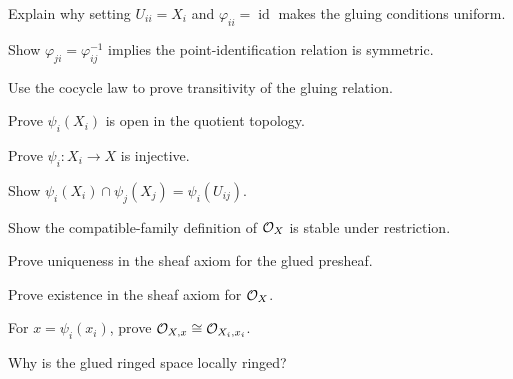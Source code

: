 \begin{exercise}\label{ex:vi20-01}
Explain why setting $U_{ii}=X_i$ and $\varphi_{ii}=\operatorname{id}$ makes the gluing conditions uniform.
\end{exercise}

\begin{exercise}\label{ex:vi20-02}
Show $\varphi_{ji}=\varphi_{ij}^{-1}$ implies the point-identification relation is symmetric.
\end{exercise}

\begin{exercise}[Transitivity]\label{ex:vi20-03}
Use the cocycle law to prove transitivity of the gluing relation.
\end{exercise}

\begin{exercise}\label{ex:vi20-04}
Prove $\psi_i(X_i)$ is open in the quotient topology.
\end{exercise}

\begin{exercise}\label{ex:vi20-05}
Prove $\psi_i:X_i\to X$ is injective.
\end{exercise}

\begin{exercise}\label{ex:vi20-06}
Show $\psi_i(X_i)\cap\psi_j(X_j)=\psi_i(U_{ij})$.
\end{exercise}

\begin{exercise}\label{ex:vi20-07}
Show the compatible-family definition of $\mathcal O_X$ is stable under restriction.
\end{exercise}

\begin{exercise}\label{ex:vi20-08}
Prove uniqueness in the sheaf axiom for the glued presheaf.
\end{exercise}

\begin{exercise}\label{ex:vi20-09}
Prove existence in the sheaf axiom for $\mathcal O_X$.
\end{exercise}

\begin{exercise}\label{ex:vi20-10}
For $x=\psi_i(x_i)$, prove $\mathcal O_{X,x}\cong\mathcal O_{X_i,x_i}$.
\end{exercise}

\begin{exercise}[Locality]\label{ex:vi20-11}
Why is the glued ringed space locally ringed?
\end{exercise}

